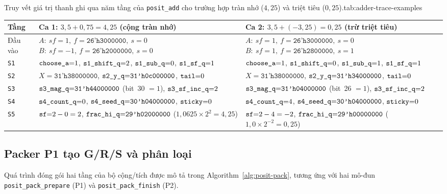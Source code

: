 \begin{engineeringtable}{Truy vết giá trị thanh ghi qua năm tầng của \texttt{posit\_add} cho trường hợp tràn nhớ ($4{,}25$) và triệt tiêu ($0{,}25$).}{tab:adder-trace-examples}
\begin{tabularx}{\linewidth}{@{}>{\raggedright\arraybackslash}p{16mm} >{\raggedright\arraybackslash}p{62mm} >{\raggedright\arraybackslash}p{62mm}@{}}
\toprule
Tầng & Ca 1: $3{,}5 + 0{,}75 = 4{,}25$ (cộng tràn nhớ) & Ca 2: $3{,}5 + (-3{,}25) = 0{,}25$ (trừ triệt tiêu) \\
\midrule
Đầu vào &
$A{:}\ sf{=}1,\ f{=}\texttt{26'h3000000},\ s{=}0$\newline
$B{:}\ sf{=}-1,\ f{=}\texttt{26'h2000000},\ s{=}0$ &
$A{:}\ sf{=}1,\ f{=}\texttt{26'h3000000},\ s{=}0$\newline
$B{:}\ sf{=}1,\ f{=}\texttt{26'h2800000},\ s{=}1$ \\
\addlinespace[3pt]
\texttt{S1} &
$\texttt{choose\_a}{=}1$, $\texttt{s1\_shift\_q}{=}2$, $\texttt{s1\_sub\_q}{=}0$, $\texttt{s1\_sf\_q}{=}1$ &
$\texttt{choose\_a}{=}1$, $\texttt{s1\_shift\_q}{=}0$, $\texttt{s1\_sub\_q}{=}1$, $\texttt{s1\_sf\_q}{=}1$ \\
\texttt{S2} &
$X{=}\texttt{31'h38000000}$, $\texttt{s2\_y\_q}{=}\texttt{31'h0c000000}$, $\texttt{tail}{=}0$ &
$X{=}\texttt{31'h38000000}$, $\texttt{s2\_y\_q}{=}\texttt{31'h34000000}$, $\texttt{tail}{=}0$ \\
\texttt{S3} &
$\texttt{s3\_mag\_q}{=}\texttt{31'h44000000}$ (bit~30 $=1$), $\texttt{s3\_sf\_inc\_q}{=}2$ &
$\texttt{s3\_mag\_q}{=}\texttt{31'h04000000}$ (bit~26 $=1$), $\texttt{s3\_sf\_inc\_q}{=}2$ \\
\texttt{S4} &
$\texttt{s4\_count\_q}{=}0$, $\texttt{s4\_seed\_q}{=}\texttt{30'h04000000}$, $\texttt{sticky}{=}0$ &
$\texttt{s4\_count\_q}{=}4$, $\texttt{s4\_seed\_q}{=}\texttt{30'h04000000}$, $\texttt{sticky}{=}0$ \\
\texttt{S5} &
$\texttt{sf}{=}2-0=2$, $\texttt{frac\_hi\_q}{=}\texttt{29'h02000000}$ ($1{,}0625\times 2^2=4{,}25$) &
$\texttt{sf}{=}2-4=-2$, $\texttt{frac\_hi\_q}{=}\texttt{29'h00000000}$ ($1{,}0\times 2^{-2}=0{,}25$) \\
\bottomrule
\end{tabularx}
\end{engineeringtable}

\subsection{Packer P1 tạo G/R/S và phân loại}

Quá trình đóng gói hai tầng của bộ cộng/tích được mô tả trong
Algorithm~\ref{alg:posit-pack}, tương ứng với hai mô-đun
\texttt{posit\_pack\_prepare} (P1) và \texttt{posit\_pack\_finish} (P2).

